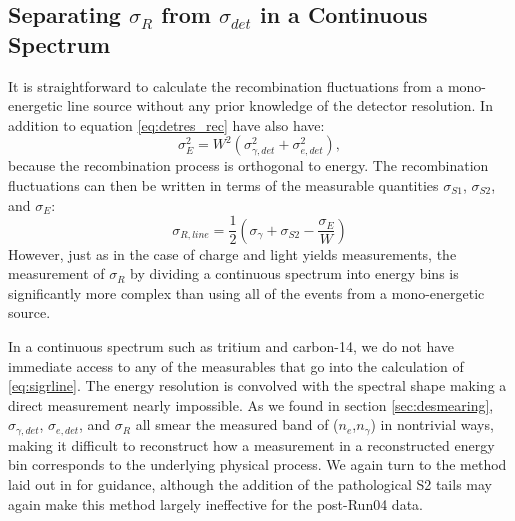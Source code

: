 \subsection{Separating $\sigma_R$ from $\sigma_{det}$ in a Continuous Spectrum}
It is straightforward to calculate the recombination fluctuations from a mono-energetic line source without any prior knowledge of the detector resolution. In addition to equation \ref{eq:detres_rec} have also have: 
\begin{equation}
\sigma_E^2=W^2\left(\sigma_{\gamma,det}^2+\sigma_{e,det}^2\right),
\end{equation}
because the recombination process is orthogonal to energy. The recombination fluctuations can then be written in terms of the measurable quantities $\sigma_{S1}$, $\sigma_{S2}$, and $\sigma_{E}$:
\begin{equation}\label{eq:sigrline}
\sigma_{R,line}=\frac{1}{2}\left(\sigma_{\gamma}+\sigma_{S2}-\frac{\sigma_{E}}{W}\right)
\end{equation}
However, just as in the case of charge and light yields measurements, the measurement of $\sigma_R$ by dividing a continuous spectrum into energy bins is significantly more complex than using all of the events from a mono-energetic source. 

In a continuous spectrum such as tritium and carbon-14, we do not have immediate access to any of the measurables that go into the calculation of \ref{eq:sigrline}. The energy resolution is convolved with the spectral shape making a direct measurement nearly impossible. As we found in section \ref{sec:desmearing}, $\sigma_{\gamma,det}$, $\sigma_{e,det}$, and $\sigma_{R}$ all smear the measured band of ($n_{e}$,$n_{\gamma}$) in nontrivial ways, making it difficult to reconstruct how a measurement in a reconstructed energy bin corresponds to the underlying physical process. We again turn to the method laid out in \cite{attila} for guidance, although the addition of the pathological S2 tails may again make this method largely ineffective for the post-Run04 data. 

